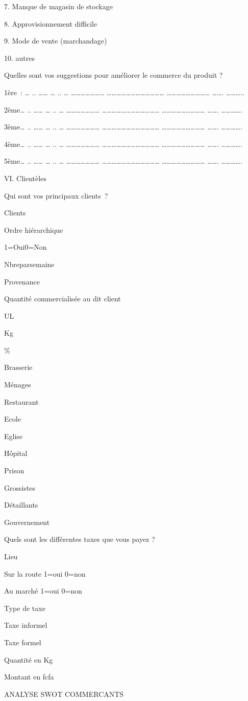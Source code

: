 \documentclass[12pt,oneside]{report}
\begin{document}
7. Manque de magasin de stockage

8. Approvisionnement difficile

9. Mode de vente (marchandage)

10. autres

Quelles sont vos suggestions pour améliorer le commerce du produit ?

1ère : … .. …… … .. … ………………… ……………………………… ……………………… ……. ………..

2ème… .. …… … .. … ………………… ……………………………… ……………………… ……. ………….

3ème… .. …… … .. … ………………… ……………………………… ……………………… ……. ………….

4ème… .. …… … .. … ………………… ……………………………… ……………………… ……. ………….

5ème… .. …… … .. … ………………… ……………………………… ……………………… ……. ………….

VI. Clientèles

Qui sont vos principaux clients ?

Clients

Ordre hiérarchique

1=Oui0=Non

Nbreparsemaine

Provenance

Quantité commercialisée au dit client

UL

Kg

\%

Brasserie

Ménages

Restaurant

Ecole

Eglise

Hôpital

Prison

Grossistes

Détaillants

Gouvernement

Quels sont les différentes taxes que vous payez ?

Lieu

Sur la route 1=oui 0=non

Au marché 1=oui 0=non

Type de taxe

Taxe informel

Taxe formel

Quantité en Kg

Montant en fcfa

ANALYSE SWOT COMMERCANTS
\end{document}
